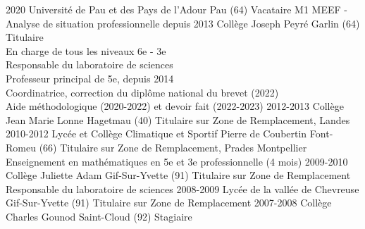 \documentclass{cv-style-cec}
\begin{document}
\begin{entrylist}
\entry
{2020}
{Université de Pau et des Pays de l'Adour}
{Pau (64)}
{Vacataire M1 MEEF - Analyse de situation professionnelle}
\entry
{depuis 2013}
{Collège Joseph Peyré}
{Garlin (64)}
{Titulaire\\
En charge de tous les niveaux 6e - 3e\\
Responsable du laboratoire de sciences\\
Professeur principal de 5e, depuis 2014\\
Coordinatrice, correction du diplôme national du brevet (2022)\\
Aide méthodologique (2020-2022) et devoir fait (2022-2023)}
\entry
{2012-2013}
{Collège Jean Marie Lonne}
{Hagetmau (40)}
{Titulaire sur Zone de Remplacement, Landes}
\entry
{2010-2012}
{Lycée et Collège Climatique et Sportif Pierre de Coubertin}
{Font-Romeu (66)}
{Titulaire sur Zone de Remplacement, Prades Montpellier\\
Enseignement en mathématiques en 5e et 3e professionnelle (4 mois)
}
\entry
{2009-2010}
{Collège Juliette Adam}
{Gif-Sur-Yvette (91)}
{Titulaire sur Zone de Remplacement\\ Responsable du laboratoire de sciences}
\entry
{2008-2009}
{Lycée de la vallée de Chevreuse}
{Gif-Sur-Yvette (91)}
{Titulaire sur Zone de Remplacement}
\entry
{2007-2008}
{Collège Charles Gounod}
{Saint-Cloud (92)}
{Stagiaire}
\end{entrylist}
\vspace{-2.4ex}
\end{document}

